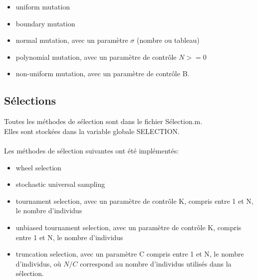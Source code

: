 \documentclass[12pt, letterpaper]{article}
\begin{document}
\begin{itemize}
\item uniform mutation\\
  
\item boundary mutation\\
  
\item normal mutation, avec un paramètre $\sigma$ (nombre ou tableau)\\
  
\item polynomial mutation, avec un paramètre de contrôle $N >= 0$\\
  
\item non-uniform mutation, avec un paramètre de contrôle B.\\
\end{itemize}

\subsection{Sélections}

Toutes les méthodes de sélection sont dans le fichier Sélection.m.\\
Elles sont stockées dans la variable globale SELECTION.
\\\\
Les méthodes de sélection suivantes ont été implémentés:

\begin{itemize}
  
\item wheel selection\\
	
\item stochastic universal sampling\\
	
\item tournament selection, avec un paramètre de contrôle K, compris
  entre 1 et N, le nombre d'individus\\
	
\item unbiased tournament selection, avec un paramètre de contrôle K,
  compris entre 1 et N, le nombre d'individus\\
	
\item truncation selection, avec un paramètre C compris entre 1 et N,
  le nombre d'individus, où $N/C$ correspond au nombre d'individus
  utilisés dans la sélection.\\
\end{itemize}
\end{document}
